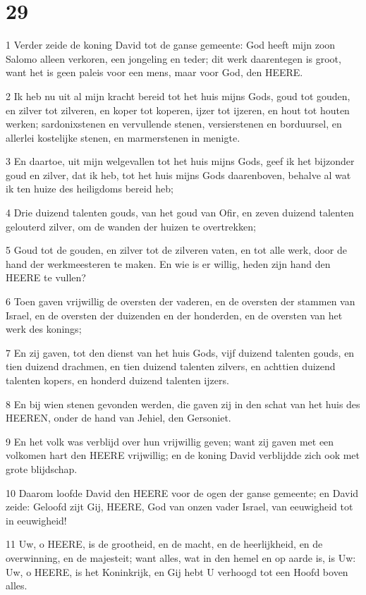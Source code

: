 \chapter{29}

\par 1 Verder zeide de koning David tot de ganse gemeente: God heeft mijn zoon Salomo alleen verkoren, een jongeling en teder; dit werk daarentegen is groot, want het is geen paleis voor een mens, maar voor God, den HEERE.
\par 2 Ik heb nu uit al mijn kracht bereid tot het huis mijns Gods, goud tot gouden, en zilver tot zilveren, en koper tot koperen, ijzer tot ijzeren, en hout tot houten werken; sardonixstenen en vervullende stenen, versierstenen en borduursel, en allerlei kostelijke stenen, en marmerstenen in menigte.
\par 3 En daartoe, uit mijn welgevallen tot het huis mijns Gods, geef ik het bijzonder goud en zilver, dat ik heb, tot het huis mijns Gods daarenboven, behalve al wat ik ten huize des heiligdoms bereid heb;
\par 4 Drie duizend talenten gouds, van het goud van Ofir, en zeven duizend talenten gelouterd zilver, om de wanden der huizen te overtrekken;
\par 5 Goud tot de gouden, en zilver tot de zilveren vaten, en tot alle werk, door de hand der werkmeesteren te maken. En wie is er willig, heden zijn hand den HEERE te vullen?
\par 6 Toen gaven vrijwillig de oversten der vaderen, en de oversten der stammen van Israel, en de oversten der duizenden en der honderden, en de oversten van het werk des konings;
\par 7 En zij gaven, tot den dienst van het huis Gods, vijf duizend talenten gouds, en tien duizend drachmen, en tien duizend talenten zilvers, en achttien duizend talenten kopers, en honderd duizend talenten ijzers.
\par 8 En bij wien stenen gevonden werden, die gaven zij in den schat van het huis des HEEREN, onder de hand van Jehiel, den Gersoniet.
\par 9 En het volk was verblijd over hun vrijwillig geven; want zij gaven met een volkomen hart den HEERE vrijwillig; en de koning David verblijdde zich ook met grote blijdschap.
\par 10 Daarom loofde David den HEERE voor de ogen der ganse gemeente; en David zeide: Geloofd zijt Gij, HEERE, God van onzen vader Israel, van eeuwigheid tot in eeuwigheid!
\par 11 Uw, o HEERE, is de grootheid, en de macht, en de heerlijkheid, en de overwinning, en de majesteit; want alles, wat in den hemel en op aarde is, is Uw: Uw, o HEERE, is het Koninkrijk, en Gij hebt U verhoogd tot een Hoofd boven alles.
